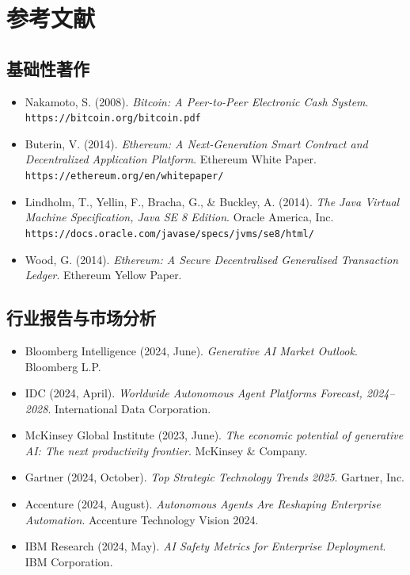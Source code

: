 \documentclass[11pt]{article}
\begin{document}
\clearpage

\section*{参考文献}

\subsection*{基础性著作}

\begin{itemize}[leftmargin=*, label={}]
  \item Nakamoto, S. (2008). \textit{Bitcoin: A Peer-to-Peer Electronic Cash System}. \texttt{https://bitcoin.org/bitcoin.pdf}

  \item Buterin, V. (2014). \textit{Ethereum: A Next-Generation Smart Contract and Decentralized Application Platform}. Ethereum White Paper. \texttt{https://ethereum.org/en/whitepaper/}

  \item Lindholm, T., Yellin, F., Bracha, G., \& Buckley, A. (2014). \textit{The Java Virtual Machine Specification, Java SE 8 Edition}. Oracle America, Inc. \texttt{https://docs.oracle.com/javase/specs/jvms/se8/html/}

  \item Wood, G. (2014). \textit{Ethereum: A Secure Decentralised Generalised Transaction Ledger}. Ethereum Yellow Paper.
\end{itemize}

\subsection*{行业报告与市场分析}

\begin{itemize}[leftmargin=*, label={}]
  \item Bloomberg Intelligence (2024, June). \textit{Generative AI Market Outlook}. Bloomberg L.P.

  \item IDC (2024, April). \textit{Worldwide Autonomous Agent Platforms Forecast, 2024--2028}. International Data Corporation.

  \item McKinsey Global Institute (2023, June). \textit{The economic potential of generative AI: The next productivity frontier}. McKinsey \& Company.

  \item Gartner (2024, October). \textit{Top Strategic Technology Trends 2025}. Gartner, Inc.

  \item Accenture (2024, August). \textit{Autonomous Agents Are Reshaping Enterprise Automation}. Accenture Technology Vision 2024.

  \item IBM Research (2024, May). \textit{AI Safety Metrics for Enterprise Deployment}. IBM Corporation.
\end{itemize}
\end{document}
